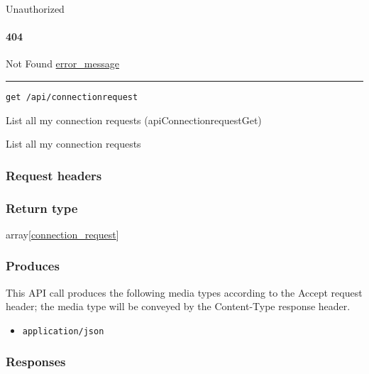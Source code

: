 Unauthorized \protect\hyperlink{}{}

\hypertarget{section-81}{%
\paragraph{404}\label{section-81}}

Not Found \protect\hyperlink{error_message}{error\_message}

\begin{center}\rule{0.5\linewidth}{\linethickness}\end{center}

\protect\hypertarget{apiConnectionrequestGet}{}{}

\begin{verbatim}
get /api/connectionrequest
\end{verbatim}

List all my connection requests ({apiConnectionrequestGet})

List all my connection requests

\hypertarget{request-headers-11}{%
\subsubsection{Request headers}\label{request-headers-11}}

\hypertarget{return-type-19}{%
\subsubsection{Return type}\label{return-type-19}}

array{[}\protect\hyperlink{connection_request}{connection\_request}{]}

\hypertarget{produces-25}{%
\subsubsection{Produces}\label{produces-25}}

This API call produces the following media types according to the
{Accept} request header; the media type will be conveyed by the
{Content-Type} response header.

\begin{itemize}
\tightlist
\item
  \texttt{application/json}
\end{itemize}

\hypertarget{responses-25}{%
\subsubsection{Responses}\label{responses-25}}

